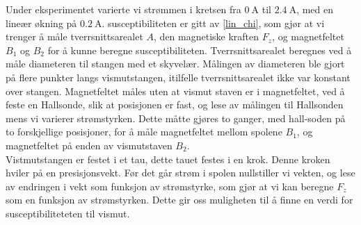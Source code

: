 \documentclass[%
 reprint,
nofootinbib,
aps,
]{revtex4-1}
\begin{document}
Under eksperimentet varierte vi strømmen i kretsen fra $\SI{0}{\ampere}$ til $\SI{2.4}{\ampere}$, med en lineær økning på $\SI{0.2}{\ampere}$. susceptibiliteten er gitt av \eqref{lin_chi}, som gjør at vi trenger å måle tverrsnittsarealet $A$, den magnetiske kraften $F_z$, og magnetfeltet $B_1$ og $B_2$ for å kunne beregne susceptibiliteten. Tverrsnittsarealet beregnes ved å måle diameteren til stangen med et skyvelær. Målingen av diameteren ble gjort på flere punkter langs vismutstangen, itilfelle tverrsnittsarealet ikke var konstant over stangen. Magnetfeltet måles uten at vismut staven er i magnetfeltet, ved å feste en Hallsonde, slik at posisjonen er fast, og lese av målingen til Hallsonden mens vi varierer strømstyrken. Dette måtte gjøres to ganger, med hall-soden på to forskjellige posisjoner, for å måle magnetfeltet mellom spolene $B_1$, og magnetfeltet på enden av vismutstaven $B_2$. \\
Vistmutstangen er festet i et tau, dette tauet festes i en krok. Denne kroken hviler på en presisjonsvekt. Før det går strøm i spolen nullstiller vi vekten, og lese av endringen i vekt som funksjon av strømstyrke, som gjør at vi kan beregne $F_z$ som en funksjon av strømstyrken. Dette gir oss muligheten til å finne en verdi for susceptibiliteteten til vismut.
\end{document}
